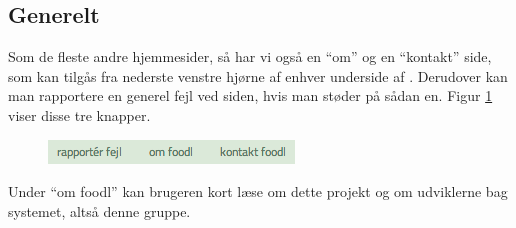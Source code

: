 \subsection{Generelt}
Som de fleste andre hjemmesider, så har vi også en ``om'' og en ``kontakt'' side, som kan tilgås fra nederste venstre hjørne af enhver underside af \Foodl{}. Derudover kan man rapportere en generel fejl ved siden, hvis man støder på sådan en. Figur \ref{fig:foodl-formaliteter} viser disse tre knapper.

\begin{figure}[H]
	\centering
	\includegraphics[scale=0.7]{billeder/foodl/formaliteter.png}
	\label{fig:foodl-formaliteter}
\end{figure}

Under ``om foodl'' kan brugeren kort læse om dette projekt og om udviklerne bag systemet, altså denne gruppe.
